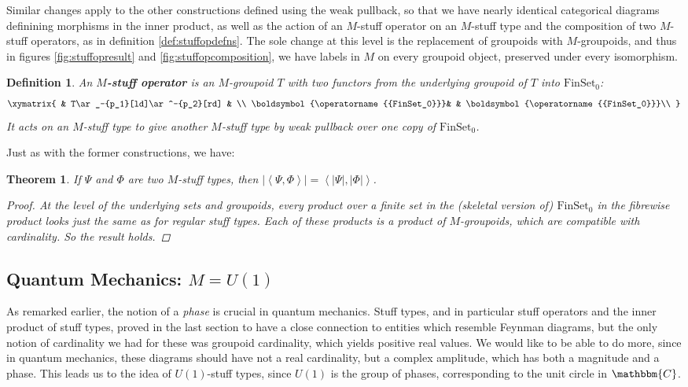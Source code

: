 \documentclass{amsart} \usepackage{amsmath,amssymb,bbm}
\newcommand{\opname}[1]{\operatorname{#1}}
\newtheorem{definition}{Definition}
\newcommand{\catname}[1]{\boldsymbol{\opname{{#1}}}}
\newcommand{\FSN}{\catname{FinSet_0}}
\newcommand{\inprod}[1]{\left\langle{#1}\right\rangle}
\newtheorem{theorem}{Theorem}
\begin{document}
Similar changes apply to the other constructions defined using the
weak pullback, so that we have nearly identical categorical diagrams
definining morphisms in the inner product, as well as the action of an
$M$-stuff operator on an $M$-stuff type and the composition of two
$M$-stuff operators, as in definition \ref{def:stuffopdefns}.  The
sole change at this level is the replacement of groupoids with
$M$-groupoids, and thus in figures \ref{fig:stuffopresult} and
\ref{fig:stuffopcomposition}, we have labels in $M$ on every
groupoid object, preserved under every isomorphism.

\begin{definition} An \textbf{$M$-stuff operator} is an $M$-groupoid $T$ with
two functors from the underlying groupoid of $T$ into $\FSN$:
\begin{equation}
 \xymatrix{
   & T\ar_-{p_1}[ld]\ar^-{p_2}[rd] & \\
  \FSN & & \FSN\\
 }
\end{equation} It acts on an $M$-stuff type to give another $M$-stuff
type by weak pullback over one copy of $\FSN$.
\end{definition}

Just as with the former constructions, we have:

\begin{theorem} If $\Psi$ and $\Phi$ are two $M$-stuff types, then
$|\inprod{\Psi,\Phi}|=\inprod{|\Psi|,|\Phi|}$.
  \begin{proof}
    At the level of the underlying sets and groupoids, every product
    over a finite set in the (skeletal version of) $\FSN$ in the
    fibrewise product looks just the same as for regular stuff types.
    Each of these products is a product of $M$-groupoids, which are
    compatible with cardinality.  So the result holds.
  \end{proof}
\end{theorem}

\subsection{Quantum Mechanics:  $M=U(1)$}
\label{mstuffu1}

As remarked earlier, the notion of a {\textit{phase}} is crucial in
quantum mechanics.  Stuff types, and in particular stuff operators and
the inner product of stuff types, proved in the last section to have a
close connection to entities which resemble Feynman diagrams, but the
only notion of cardinality we had for these was groupoid cardinality,
which yields positive real values.  We would like to be able to do
more, since in quantum mechanics, these diagrams should have not a
real cardinality, but a complex amplitude, which has both a magnitude
and a phase.  This leads us to the idea of $U(1)$-stuff types,
since $U(1)$ is the group of phases, corresponding to the unit
circle in $\mathbbm{C}$.
\end{document}
